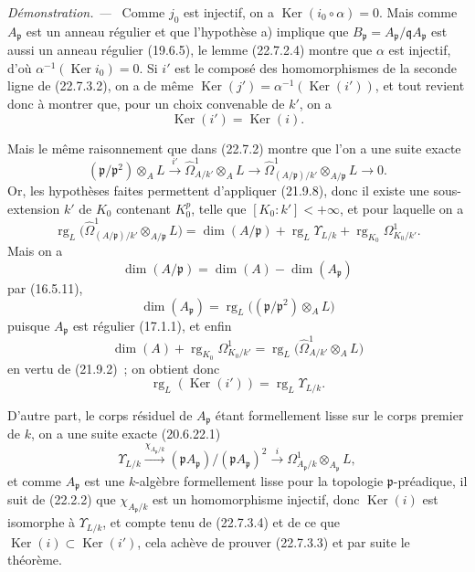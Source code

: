 \documentclass[10pt,oneside]{book}
\newenvironment{proof}{%
  \par\medskip\noindent\textit{Démonstration. ---\ }}{\par}
\begin{document}
\begin{proof}
Comme $j_0$ est injectif, on a $\operatorname{Ker}(i_0\circ\alpha)=0$. Mais comme
$A_{\mathfrak p}$ est un anneau régulier et que l'hypothèse a) implique que
$B_{\mathfrak p}=A_{\mathfrak p}/\mathfrak qA_{\mathfrak p}$ est aussi un
anneau régulier (19.6.5), le lemme (22.7.2.4) montre que $\alpha$ est injectif,
d'où $\alpha^{-1}(\operatorname{Ker} i_0)=0$. Si $i'$ est le composé des homomorphismes de la
seconde ligne de (22.7.3.2), on a de même
$\operatorname{Ker}(j')=\alpha^{-1}(\operatorname{Ker}(i'))$, et tout revient donc à montrer que, pour un
choix convenable de $k'$, on a
\begin{equation}
\label{0.22.7.3.3-fr}
  \operatorname{Ker}(i')=\operatorname{Ker}(i).
  \tag{22.7.3.3}
\end{equation}

Mais le même raisonnement que dans (22.7.2) montre que l'on a une suite exacte
\[
  (\mathfrak p/\mathfrak p^2)\otimes_AL\xrightarrow{i'}
  \widehat\Omega^1_{A/k'}\otimes_AL\longrightarrow
  \widehat\Omega^1_{(A/\mathfrak p)/k'}\otimes_{A/\mathfrak p}L
  \longrightarrow0.
\]
Or, les hypothèses faites permettent d'appliquer (21.9.8), donc il existe une
sous-extension $k'$ de $K_0$ contenant $K_0^p$, telle que
$[K_0:k']<+\infty$, et pour laquelle on a
\[
  \operatorname{rg}_L\bigl(\widehat\Omega^1_{(A/\mathfrak p)/k'}
  \otimes_{A/\mathfrak p}L\bigr)
  =\dim(A/\mathfrak p)+\operatorname{rg}_L\Upsilon_{L/k}
  +\operatorname{rg}_{K_0}\Omega^1_{K_0/k'}.
\]
Mais on a
\[
  \dim(A/\mathfrak p)=\dim(A)-\dim(A_{\mathfrak p})
\]
par (16.5.11),
\[
  \dim(A_{\mathfrak p})
  =\operatorname{rg}_L\bigl((\mathfrak p/\mathfrak p^2)\otimes_AL\bigr)
\]
puisque $A_{\mathfrak p}$ est régulier (17.1.1), et enfin
\[
  \dim(A)+\operatorname{rg}_{K_0}\Omega^1_{K_0/k'}
  =\operatorname{rg}_L\bigl(\widehat\Omega^1_{A/k'}\otimes_AL\bigr)
\]
en vertu de (21.9.2)~; on obtient donc
\begin{equation}
\label{0.22.7.3.4-fr}
  \operatorname{rg}_L(\operatorname{Ker}(i'))=\operatorname{rg}_L\Upsilon_{L/k}.
  \tag{22.7.3.4}
\end{equation}

D'autre part, le corps résiduel de $A_{\mathfrak p}$ étant formellement lisse
sur le corps premier de $k$, on a une suite exacte (20.6.22.1)
\[
  \Upsilon_{L/k}\xrightarrow{\chi_{A_{\mathfrak p}/k}}
  (\mathfrak pA_{\mathfrak p})/(\mathfrak pA_{\mathfrak p})^2
  \xrightarrow{i}\Omega^1_{A_{\mathfrak p}/k}
  \otimes_{A_{\mathfrak p}}L,
\]
et comme $A_{\mathfrak p}$ est une $k$-algèbre formellement lisse pour la
topologie $\mathfrak p$-préadique, il suit de (22.2.2) que
$\chi_{A_{\mathfrak p}/k}$ est un homomorphisme injectif, donc $\operatorname{Ker}(i)$ est
isomorphe à $\Upsilon_{L/k}$, et compte tenu de (22.7.3.4) et de ce que
$\operatorname{Ker}(i)\subset\operatorname{Ker}(i')$, cela achève de prouver (22.7.3.3) et par suite le
théorème.
\end{proof}
\end{document}

